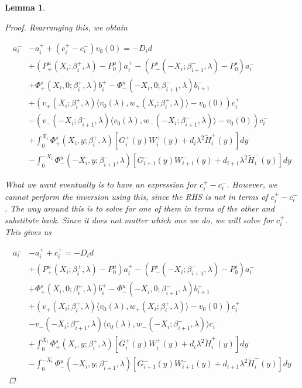 \documentclass[12pt]{article}
\newtheorem{lemma}{Lemma}
\begin{document}
\begin{lemma}
\begin{proof}
Rearranging this, we obtain

\begin{align*}
a_i^- &- a_i^+ + (c_i^+ - c_i^-)v_0(0) = -D_i d  \\
&+ (P^u_+(X_i; \beta_i^+, \lambda) - P_0^u)a_i^+ - (P^s_-(-X_i; \beta_{i+1}^-,\lambda) - P_0^s)a_i^- \\
&+ \Phi^s_+(X_i, 0; \beta_i^+, \lambda)b_i^+ - \Phi^u_-(-X_i, 0; \beta_{i+1}^-, \lambda) b_{i+1}^- \\
&+ (v_+(X_i; \beta_i^+, \lambda) \langle v_0(\lambda), w_+(X_i; \beta_i^+, \lambda) \rangle - v_0(0) ) c_i^+ \\
&- (v_-(-X_i; \beta_{i+1}^-, \lambda) \langle v_0(\lambda), w_-(-X_i; \beta_{i+1}^-, \lambda) \rangle - v_0(0) ) c_i^- \\
&+ \int_0^{X_i} \Phi^s_+(X_i, y; \beta_i^+, \lambda) [ G_i^+(y) W_i^+(y) + d_i \lambda^2 \tilde{H}_i^+(y) ] dy \\
&- \int_0^{-X_i} \Phi^u_-(-X_i, y; \beta_{i+1}^-, \lambda) [ G_{i+1}^-(y) W_{i+1}^-(y) + d_{i+1} \lambda^2 \tilde{H}_i^-(y) ] dy
\end{align*}

What we want eventually is to have an expression for $c_i^+ - c_i^-$. However, we cannot perform the inversion using this, since the RHS is not in terms of $c_i^+ - c_i^-$. The way around this is to solve for one of them in terms of the other and substitute back. Since it does not matter which one we do, we will solve for $c_i^+$. This gives us

\begin{align*}
a_i^- &- a_i^+ + c_i^+ = -D_i d  \\
&+ (P^u_+(X_i; \beta_i^+, \lambda) - P_0^u)a_i^+ - (P^s_-(-X_i; \beta_{i+1}^-,\lambda) - P_0^s)a_i^- \\
&+ \Phi^s_+(X_i, 0; \beta_i^+, \lambda)b_i^+ - \Phi^u_-(-X_i, 0; \beta_{i+1}^-, \lambda) b_{i+1}^- \\
&+ (v_+(X_i; \beta_i^+, \lambda) \langle v_0(\lambda), w_+(X_i; \beta_i^+, \lambda) \rangle - v_0(0) ) c_i^+ \\
&- v_-(-X_i; \beta_{i+1}^-, \lambda) \langle v_0(\lambda), w_-(-X_i; \beta_{i+1}^-, \lambda) \rangle c_i^- \\
&+ \int_0^{X_i} \Phi^s_+(X_i, y; \beta_i^+, \lambda) [ G_i^+(y) W_i^+(y) + d_i \lambda^2 \tilde{H}_i^+(y) ] dy \\
&- \int_0^{-X_i} \Phi^u_-(-X_i, y; \beta_{i+1}^-, \lambda) [ G_{i+1}^-(y) W_{i+1}^-(y) + d_{i+1} \lambda^2 \tilde{H}_i^-(y) ] dy
\end{align*}


\end{proof}
\end{lemma}
\end{document}
